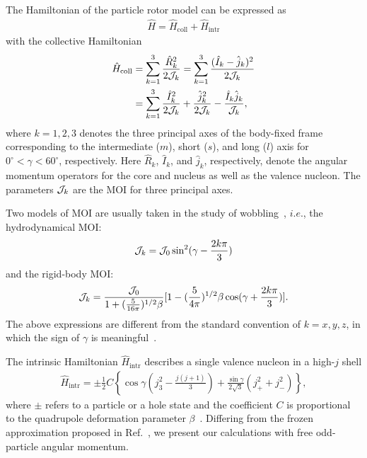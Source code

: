 \documentclass[aps,prc,preprint,showpacs,groupedaddress,floatfix,amsmath,amssymb]{revtex4-1}
\begin{document}
The Hamiltonian of the particle rotor model can be expressed as~\cite{Bohr75,Ring}
\begin{eqnarray}
\hat{H}=\hat{H}_\textrm{{coll}}+\hat{H}_\textrm{{intr}}
\end{eqnarray}
with the collective Hamiltonian
\begin{eqnarray}
\begin{aligned}
\hat{H}_\textrm{{coll}}&=\sum_{k=1}^{3}\frac{\hat{R}_{k}^{2}}{2{\cal J}_{k}}=\sum_{k=1}^{3}\frac{(\hat{I}_{k}-\hat{j}_{k})^{2}}{2{\cal J}_{k}}\\
&=\sum_{k=1}^{3}\frac{\hat{I}_{k}^{2}}{2{\cal J}_{k}}+\frac{\hat{j}_{k}^{2}}{2{\cal J}_{k}}-\frac{\hat{I}_{k}\hat{j}_{k}}{{\cal J}_{k}},
\end{aligned}
\end{eqnarray}
where $k=1,2,3$  denotes the three principal axes of the body-fixed frame corresponding to the intermediate ($m$), short ($s$), and long ($l$) axis for $0^{\circ}<\gamma<60^{\circ}$, respectively.  Here $\hat{R}_{k}$, $\hat{I}_{k}$, and $\hat{j}_{k}$, respectively, denote the angular momentum operators for the core and nucleus as well as the valence nucleon.
The parameters ${\cal J}_{k}$ are the MOI for three principal axes.

Two models of MOI are usually taken in the study of wobbling~\cite{Tanabe17,Tanabe18}, $i.e.$, the hydrodynamical MOI:
\begin{eqnarray}
{\cal J}_{k}={\cal J}_0 \sin ^{2}(\gamma-\frac{2 k \pi}{3})
\end{eqnarray}
and the rigid-body MOI:
\begin{eqnarray}
{\cal J}_{k}= \frac{{\cal J}_0}{1+(\frac{5}{16\pi})^{1/2} \beta }[1-(\frac{5}{4\pi})^{1/2}\beta \cos (\gamma+\frac{2 k \pi}{3})].
\end{eqnarray}
The above expressions are different from the standard convention of $k = x, y, z$, in which the sign of
$\gamma$ is meaningful~\cite{Hamamoto02,Ring}.


The intrinsic Hamiltonian $\hat{H}_\textrm{{intr}}$ describes a single valence nucleon in a high-$j$ shell
\begin{eqnarray}
\hat{H}_\textrm{{intr}}=\pm\frac{1}{2} C\left\{\cos \gamma\left(j_{3}^{2}-\frac{j(j+1)}{3}\right)+\frac{\sin \gamma}{2 \sqrt{3}}\left(j_{+}^{2}+j_{-}^{2}\right)\right\},
\end{eqnarray}
where $\pm$ refers to a particle or a hole state and the coefficient $C$ is proportional to the quadrupole deformation parameter $\beta$~\cite{Qi09}. Differing from the frozen approximation proposed in Ref.~\cite{Frauendorf14}, we present our calculations with free odd-particle angular momentum.
\end{document}
